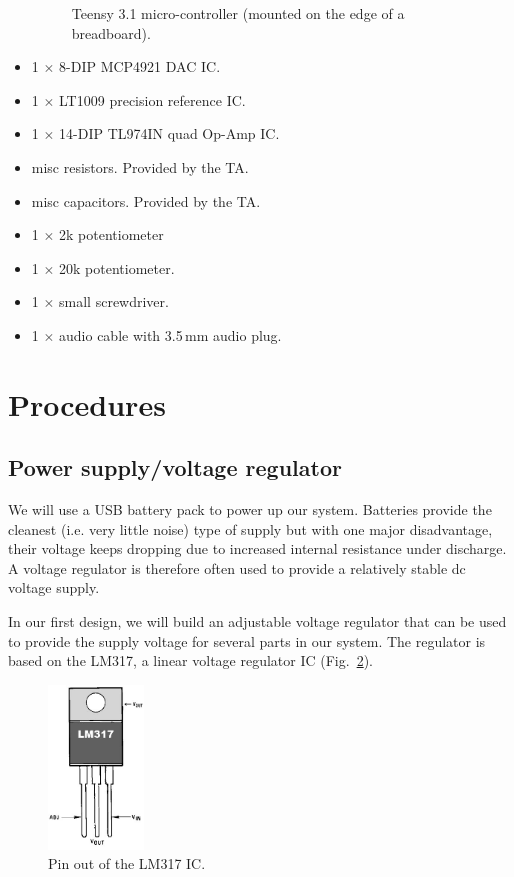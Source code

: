 \documentclass[letterpaper, 11pt]{article}
\begin{document}
\begin{itemize}[itemsep=0.5ex]
\begin{figure}[h]
		\caption{Teensy 3.1 micro-controller (mounted on the edge of a breadboard).}
		\label{fig:battery-pic}
	\end{figure}
\item 1 $\times$ 8-DIP MCP4921 DAC IC.
\item 1 $\times$ LT1009 precision reference IC.
\item 1 $\times$ 14-DIP TL974IN quad Op-Amp IC.
\item misc resistors. Provided by the TA.
\item misc capacitors. Provided by the TA. 
\item 1 $\times$ 2k potentiometer
\item 1 $\times$ 20k potentiometer.
\item 1 $\times$ small screwdriver.
\item 1 $\times$ audio cable with 3.5\,mm audio plug.
\end{itemize}

\newpage
\section{Procedures}

\subsection{Power supply/voltage regulator}
\label{sec:lm317}

We will use a USB battery pack to power up our system. Batteries provide the cleanest (i.e. very little noise) type of supply but with one major disadvantage, their voltage keeps dropping due to increased internal resistance under discharge. A voltage regulator is therefore often used to provide a relatively stable dc voltage supply.

In our first design, we will build an adjustable voltage regulator that can be used to provide the supply voltage for several parts in our system. The regulator is based on the LM317, a linear voltage regulator IC (Fig.~\ref{fig:lm317}).

\begin{figure}[h]
	\centering
	\includegraphics[width=1in]{lm317}
	\caption{Pin out of the LM317 IC.}
	\label{fig:lm317}
\end{figure}
\end{document}

